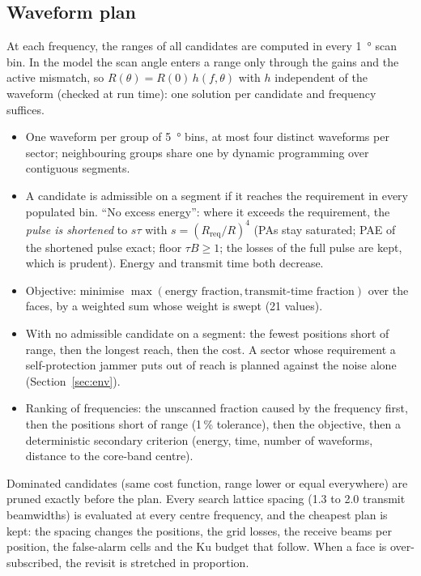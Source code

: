 \documentclass[11pt,a4paper]{article}
\begin{document}
\subsection{Waveform plan}
At each frequency, the ranges of all candidates are computed in every \SI{1}{\degree} scan bin. In the model the scan
angle enters a range only through the gains and the active mismatch, so $R(\theta) = R(0)\,h(f,\theta)$ with $h$
independent of the waveform (checked at run time): one solution per candidate and frequency suffices.
\begin{itemize}
  \item One waveform per group of \SI{5}{\degree} bins, at most four distinct waveforms per sector; neighbouring groups
        share one by dynamic programming over contiguous segments.
  \item A candidate is admissible on a segment if it reaches the requirement in every populated bin. ``No excess
        energy'': where it exceeds the requirement, the \emph{pulse is shortened} to $s\tau$ with $s = (R_{\mathrm{req}}/R)^4$
        (PAs stay saturated; PAE of the shortened pulse exact; floor $\tau B \ge 1$; the losses of the full pulse are
        kept, which is prudent). Energy and transmit time both decrease.
  \item Objective: minimise $\max(\text{energy fraction}, \text{transmit-time fraction})$ over the faces, by a weighted
        sum whose weight is swept (21 values).
  \item With no admissible candidate on a segment: the fewest positions short of range, then the longest reach, then
        the cost. A sector whose requirement a self-protection jammer puts out of reach is planned against the noise
        alone (Section~\ref{sec:env}).
  \item Ranking of frequencies: the unscanned fraction caused by the frequency first, then the positions short of
        range (1\,\% tolerance), then the objective, then a deterministic secondary criterion (energy, time, number of
        waveforms, distance to the core-band centre).
\end{itemize}
Dominated candidates (same cost function, range lower or equal everywhere) are pruned exactly before the plan. Every
search lattice spacing (1.3 to 2.0 transmit beamwidths) is evaluated at every centre frequency, and the cheapest plan
is kept: the spacing changes the positions, the grid losses, the receive beams per position, the false-alarm cells and
the Ku budget that follow. When a face is over-subscribed, the revisit is stretched in proportion.
\end{document}
